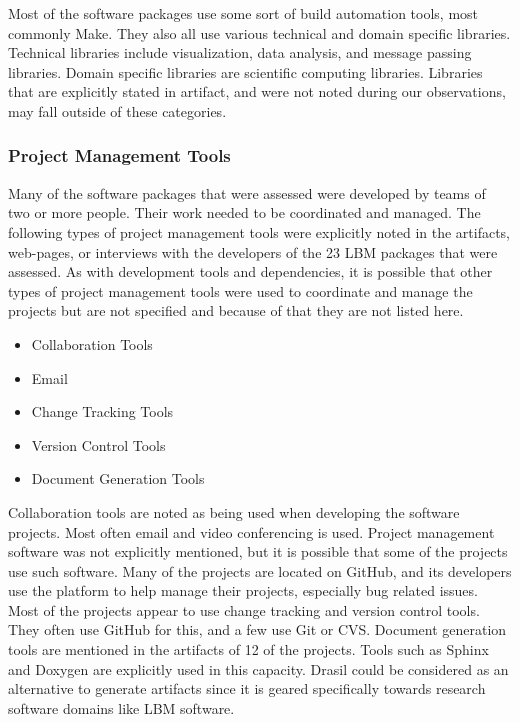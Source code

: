 \documentclass[12pt, notitlepage]{article}
\begin{document}
Most of the software packages use some sort of build automation tools, most commonly Make. They also all use various technical and domain specific libraries. Technical libraries include visualization, data analysis, and message passing libraries. Domain specific libraries are scientific computing libraries. Libraries that are explicitly stated in artifact, and were not noted during our observations, may fall outside of these categories. 

\subsubsection{Project Management Tools}

Many of the software packages that were assessed were developed by teams of two or more people. Their work needed to be coordinated and managed. The following types of project management tools were explicitly noted in the artifacts, web-pages, or interviews with the developers of the 23 LBM packages that were assessed. As with development tools and dependencies, it is possible that other types of project management tools were used to coordinate and manage the projects but are not specified and because of that they are not listed here.

\begin{singlespace}
	\begin{multicols}{2}	
		\begin{itemize}
			\item Collaboration Tools
			\item Email
			\item Change Tracking Tools
			\item Version Control Tools
			\item Document Generation Tools
		\end{itemize}
	\end{multicols}
\end{singlespace}

Collaboration tools are noted as being used when developing the software projects. Most often email and video conferencing is used. Project management software was not explicitly mentioned, but it is possible that some of the projects use such software. Many of the projects are located on GitHub, and its developers use the platform to help manage their projects, especially bug related issues. Most of the projects appear to use change tracking and version control tools. They often use GitHub for this, and a few use Git or CVS. Document generation tools are mentioned in the artifacts of 12 of the projects. Tools such as Sphinx and Doxygen are explicitly used in this capacity. Drasil could be considered as an alternative to generate artifacts since it is geared specifically towards research software domains like LBM software. 
\end{document}
